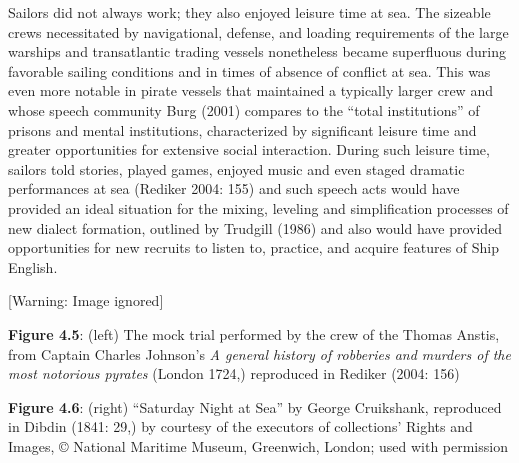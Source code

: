 \begin{styleStandard}
Sailors did not always work; they also enjoyed leisure time at sea. The sizeable crews necessitated by navigational, defense, and loading requirements of the large warships and transatlantic trading vessels nonetheless became superfluous during favorable sailing conditions and in times of absence of conflict at sea. This was even more notable in pirate vessels that maintained a typically larger crew and whose speech community Burg (2001) compares to the “total institutions” of prisons and mental institutions, characterized by significant leisure time and greater opportunities for extensive social interaction. During such leisure time, sailors told stories, played games, enjoyed music and even staged dramatic performances at sea (Rediker 2004: 155) and such speech acts would have provided an ideal situation for the mixing, leveling and simplification processes of new dialect formation, outlined by Trudgill (1986) and also would have provided opportunities for new recruits to listen to, practice, and acquire features of Ship English.
\end{styleStandard}

\begin{styleStandard}
  [Warning: Image ignored] %
 
\end{styleStandard}

\begin{center}
 [Warning: Image ignored] %

\end{center}
\begin{styleStandard}
\textbf{Figure 4.5}: (left) The mock trial performed by the crew of the Thomas Anstis, from Captain Charles Johnson’s \textit{A general history of robberies and murders of the most notorious pyrates }(London 1724,) reproduced in Rediker (2004: 156) 
\end{styleStandard}

\begin{styleStandard}
\textbf{Figure 4.6}: (right) “Saturday Night at Sea” by George Cruikshank, reproduced in Dibdin (1841: 29,) by courtesy of the executors of collections’ Rights and Images, © National Maritime Museum, Greenwich, London; used with permission
\end{styleStandard}

